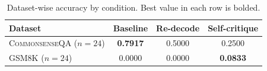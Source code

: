 \begin{table}[t]
\centering
\caption{Dataset-wise accuracy by condition. Best value in each row is bolded.}
\label{tab:dataset-accuracy}
\begin{tabular}{@{}lccc@{}}
\toprule
Dataset & Baseline & Re-decode & Self-critique \\
\midrule
\textsc{CommonsenseQA} ($n{=}24$) & {\bf 0.7917} & 0.5000 & 0.2500 \\
\textsc{GSM8K} ($n{=}24$) & 0.0000 & 0.0000 & {\bf 0.0833} \\
\bottomrule
\end{tabular}
\end{table}
